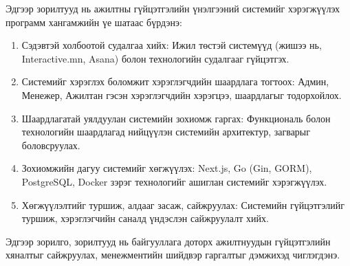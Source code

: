 Эдгээр зорилтууд нь ажилтны гүйцэтгэлийн үнэлгээний системийг хэрэгжүүлэх программ хангамжийн үе шатаас бүрдэнэ:
\begin{enumerate}
    \item Сэдэвтэй холбоотой судалгаа хийх: Ижил төстэй системүүд (жишээ нь, Interactive.mn, Asana) болон технологийн судалгааг гүйцэтгэх.
    \item Системийг хэрэглэх боломжит хэрэглэгчдийн шаардлага тогтоох: Админ, Менежер, Ажилтан гэсэн хэрэглэгчдийн хэрэгцээ, шаардлагыг тодорхойлох.
    \item Шаардлагатай уялдуулан системийн зохиомж гаргах: Функциональ болон технологийн шаардлагад нийцүүлэн системийн архитектур, загварыг боловсруулах.
    \item Зохиомжийн дагуу системийг хөгжүүлэх: Next.js, Go (Gin, GORM), PostgreSQL, Docker зэрэг технологийг ашиглан системийг хэрэгжүүлэх.
    \item Хөгжүүлэлтийг туршиж, алдааг засаж, сайжруулах: Системийн гүйцэтгэлийг туршиж, хэрэглэгчийн саналд үндэслэн сайжруулалт хийх.
\end{enumerate}

Эдгээр зорилго, зорилтууд нь байгууллага доторх ажилтнуудын гүйцэтгэлийн хяналтыг сайжруулах, менежментийн шийдвэр гаргалтыг дэмжихэд чиглэгдэнэ.
